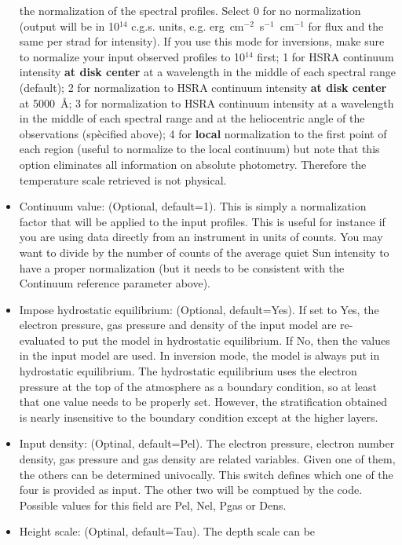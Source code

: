 \begin{itemize}
  the normalization of the spectral profiles.  Select 0 for no
  normalization (output will be in 10$^{14}$ c.g.s. units,
  e.g. erg~cm$^{-2}$~s$^{-1}$~cm$^{-1}$ for flux and the same per
  strad for intensity). If you use this mode for inversions, make sure
  to normalize your input observed profiles to 10$^{14}$ first; 1 for
  HSRA continuum intensity {\bf at disk center} at a wavelength in the
  middle of each spectral range (default); 2 for normalization to HSRA
  continuum intensity {\bf at disk center} at 5000~\AA ; 3 for
  normalization to HSRA continuum intensity at a wavelength in the
  middle of each spectral range and at the heliocentric angle of the
  observations (spècified above); 4 for {\bf local} normalization to
  the first point of each region (useful to normalize to the local
  continuum) but note that this option eliminates all information on
  absolute photometry. Therefore the temperature scale retrieved is
  not physical.
\item Continuum value: (Optional, default=1). This is simply a
  normalization factor that will be applied to the input
  profiles. This is useful for instance if you are using data
  directly from an instrument in units of counts. You may want to
  divide by the number of counts of the average quiet Sun intensity to
  have a proper normalization (but it needs to be consistent with the
  Continuum reference parameter above).
\item Impose hydrostatic equilibrium: (Optional, default=Yes). If set
  to Yes, the electron pressure, gas pressure and density of the input
  model are re-evaluated to put the model in hydrostatic
  equilibrium. If No, then the values in the input model are used. In
  inversion mode, the model is always put in hydrostatic equilibrium.
  The hydrostatic equilibrium uses the electron pressure at the top of
  the atmosphere as a boundary condition, so at least that one value
  needs to be properly set. However, the stratification obtained is nearly
  insensitive to the boundary condition except at the higher layers.
\item Input density: (Optinal, default=Pel). The electron pressure,
  electron number density, gas pressure and gas density are related
  variables. Given one of them, the others can be determined
  univocally. This switch defines which one of the four is provided
  as input. The other two will be comptued by the code. Possible
  values for this field are Pel, Nel, Pgas or Dens. 
\item Height scale: (Optinal, default=Tau). The depth scale can be

\end{itemize}

